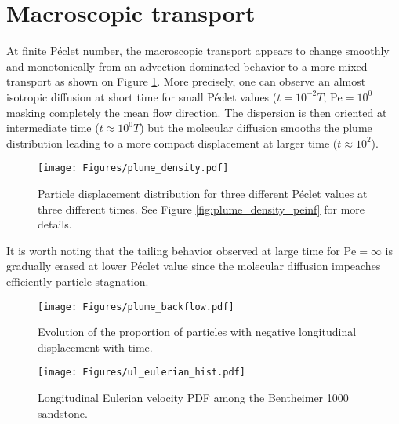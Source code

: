 \section{Macroscopic transport}
At finite Péclet number, the macroscopic transport appears to change smoothly and monotonically from an advection dominated behavior to a more mixed transport as shown on Figure \ref{fig:plume_density}.
More precisely, one can observe an almost isotropic diffusion at short time for small Péclet values ($t=10^{-2}T$, $\mathrm{Pe} = 10^0$ masking completely the mean flow direction. 
The dispersion is then oriented at intermediate time ($t\approx 10^0T$) but the molecular diffusion smooths the plume distribution leading to a more compact displacement at larger time ($t\approx 10^2$).
\begin{figure}[h!]
	\centering
	\texttt{[image: Figures/plume\_density.pdf]}
	\caption{Particle displacement distribution for three different Péclet values at three different times. See Figure \ref{fig:plume_density_peinf} for more details.}
	\label{fig:plume_density}
\end{figure}
It is worth noting that the tailing behavior observed at large time for $\mathrm{Pe}=\infty$ is gradually erased at lower Péclet value since the molecular diffusion impeaches efficiently particle stagnation.\\

\begin{figure}
	\centering
	\begin{minipage}{.49\textwidth}
		\centering
		\texttt{[image: Figures/plume\_backflow.pdf]}
		\caption{Evolution of the proportion of particles with negative longitudinal displacement with time.}
		\label{fig:backflow}
	\end{minipage}%
	\begin{minipage}{.49\textwidth}
		\centering
		\texttt{[image: Figures/ul\_eulerian\_hist.pdf]}
		\caption{Longitudinal Eulerian velocity PDF among the Bentheimer 1000 sandstone.}
		\label{fig:ul_eulerian_hist}
	\end{minipage}
\end{figure}


